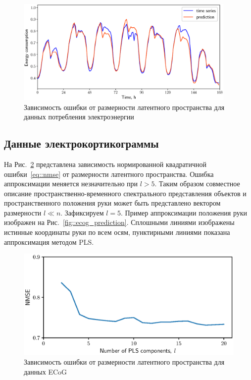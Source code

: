 \begin{figure}[ht]
	\centering
	\includegraphics[width=0.95\textwidth]{figs/ch1/energy_prediction}
	\caption{Зависимость ошибки от размерности латентного пространства для данных потребления электроэнергии}
	\label{fig::energy_prediction}
\end{figure}

\subsection{Данные электрокортикограммы}

На Рис.~\ref{fig::ecog_n_comp} представлена зависимость нормированной квадратичной ошибки~\eqref{eq::nmse} от размерности латентного пространства. Ошибка аппроксимации меняется незначительно при $l > 5$.
Таким образом совместное описание пространственно-временного спектрального представления объектов и пространственного положения руки может быть представлено вектором размерности $l \ll n$.
Зафиксируем $l = 5$. 
Пример аппроксимации положения руки изображен на Рис.~\ref{fig::ecog_prediction}. 
Сплошными линиями изображены истинные координаты руки по всем осям, пунктирными линиями показана аппроксимация методом PLS.
 
\begin{figure}[ht]
	\centering
	\includegraphics[width=0.75\linewidth]{figs/ch1/ecog_n_comp}	
	\caption{Зависимость ошибки от размерности латентного пространства для данных ECoG}
	\label{fig::ecog_n_comp}
\end{figure}


